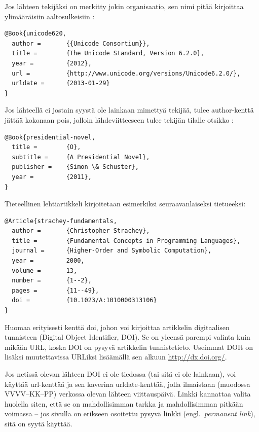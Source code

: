 \documentclass[utf8,bachelor]{gradu3}
\begin{document}
Jos lähteen tekijäksi on merkitty jokin organisaatio, sen nimi pitää
kirjoittaa ylimääräisiin
aaltosulkeisiin \parencite[esim.][]{unicode620}:

\begingroup\footnotesize
\begin{verbatim}
@Book{unicode620,
  author =       {{Unicode Consortium}},
  title =        {The Unicode Standard, Version 6.2.0},
  year =         {2012},
  url =          {http://www.unicode.org/versions/Unicode6.2.0/},
  urldate =      {2013-01-29}
}
\end{verbatim}
\endgroup

Jos lähteellä ei jostain syystä ole lainkaan mimettyä tekijää, tulee
author-kenttä jättää kokonaan pois, jolloin lähdeviitteeseen tulee
tekijän tilalle otsikko \parencite[esim.][]{presidential-novel}:

\begingroup\footnotesize
\begin{verbatim}
@Book{presidential-novel,
  title =        {O},
  subtitle =     {A Presidential Novel},
  publisher =    {Simon \& Schuster},
  year =         {2011},
}
\end{verbatim}
\endgroup

Tieteellinen lehtiartikkeli \parencite[esim.][]{strachey-fundamentals}
kirjoitetaan esimerkiksi seuraavanlaiseksi tietueeksi:

\begingroup\footnotesize
\begin{verbatim}
@Article{strachey-fundamentals,
  author =       {Christopher Strachey},
  title =        {Fundamental Concepts in Programming Languages},
  journal =      {Higher-Order and Symbolic Computation},
  year =         2000,
  volume =       13,
  number =       {1--2},
  pages =        {11--49},
  doi =          {10.1023/A:1010000313106}
}
\end{verbatim}
\endgroup

Huomaa erityisesti kenttä doi, johon voi kirjoittaa artikkelin
digitaalisen tunnisteen (Digital Object Identifier, DOI).  Se on
yleensä parempi valinta kuin mikään URL, koska DOI on pysyvä
artikkelin tunnistetieto.  Useimmat DOIt on lisäksi muutettavissa
URLiksi lisäämällä sen alkuun \url{http://dx.doi.org/}.

Jos netissä olevan lähteen DOI ei ole tiedossa (tai sitä ei ole
lainkaan), voi käyttää url-kenttää ja sen kaverina urldate-kenttää,
jolla ilmaistaan (muodossa VVVV--KK--PP) verkossa olevan lähteen
viittauspäivä.  Linkki kannattaa valita huolella siten, että se on
mahdollisimman tarkka ja mahdollisimman pitkään voimassa -- jos
sivulla on erikseen osoitettu pysyvä linkki (engl.~\emph{permanent
  link}), sitä on syytä käyttää.
\end{document}
